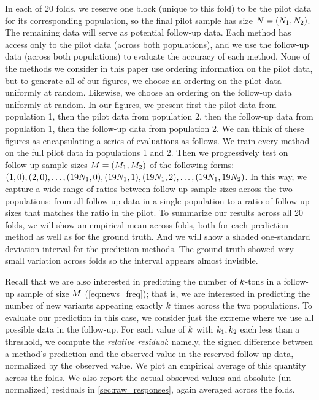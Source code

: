 In each of 20 folds, we reserve one block (unique to this fold) to be the pilot data for its corresponding population, so the final pilot sample has size $\vecsamplesize = (\samplesize{1}, \samplesize{2})$. The remaining data will serve as potential follow-up data. Each method has access only to the pilot data (across both populations), and we use the follow-up data (across both populations) to evaluate the accuracy of each method. None of the methods we consider in this paper use ordering information on the pilot data, but to generate all of our figures, we choose an ordering on the pilot data uniformly at random. Likewise, we choose an ordering on the follow-up data uniformly at random. In our figures, we present first the pilot data from population 1, then the pilot data from population 2, then the follow-up data from population 1, then the follow-up data from population 2. We can think of these figures as encapsulating a series of evaluations as follows. We train every method on the full pilot data in populations 1 and 2. Then we progressively test on follow-up sample sizes $\vecfuturesamplesize = (\futuresamplesize{1},\futuresamplesize{2})$ of the following forms: $(1,0), (2,0), \ldots, (19 N_{1},0), (19 N_{1},1), (19 N_{1},2), \ldots, (19 N_{1}, 19 N_{2})$. In this way, we capture a wide range of ratios between follow-up sample sizes across the two populations: from all follow-up data in a single population to a ratio of follow-up sizes that matches the ratio in the pilot.
To summarize our results across all 20 folds, we will show an empirical mean across folds, both for each prediction method as well as for the ground truth. And we will show a shaded one-standard deviation interval for the prediction methods. The ground truth showed very small variation across folds so the interval appears almost invisible. %

Recall that we are also interested in predicting the number of $\vecoccurrence$-tons in a follow-up sample of size $\vecfuturesamplesize$ (\cref{eq:news_freq}); that is, we are interested in predicting the number of new variants appearing exactly $\vecoccurrence$ times across the two populations. To evaluate our prediction in this case, we consider just the extreme where we use all possible data in the follow-up. For each value of $\vecoccurrence$ with $k_{1}, k_{2}$ each less than a threshold, we compute the \emph{relative residual}: namely, the signed difference between a method's prediction and the observed value in the reserved follow-up data, normalized by the observed value. We plot an empirical average of this quantity across the folds. We also report the actual observed values and absolute (un-normalized) residuals in \cref{sec:raw_responses}, again averaged across the folds.

